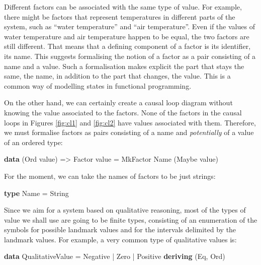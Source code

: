 \documentclass[]{article}
\newenvironment{Shaded}{}{}
\newcommand{\KeywordTok}[1]{\textcolor[rgb]{0.00,0.44,0.13}{\textbf{{#1}}}}
\newcommand{\DataTypeTok}[1]{\textcolor[rgb]{0.56,0.13,0.00}{{#1}}}
\newcommand{\OtherTok}[1]{\textcolor[rgb]{0.00,0.44,0.13}{{#1}}}
\newcommand{\FunctionTok}[1]{\textcolor[rgb]{0.02,0.16,0.49}{{#1}}}
\newcommand{\NormalTok}[1]{{#1}}
\begin{document}
Different factors can be associated with the same type of value. For
example, there might be factors that represent temperatures in different
parts of the system, such as ``water temperature'' and ``air
temperature''. Even if the values of water temperature and air
temperature happen to be equal, the two factors are still different.
That means that a defining component of a factor is its identifier, its
name. This suggests formalising the notion of a factor as a pair
consisting of a name and a value. Such a formalisation makes explicit
the part that stays the same, the name, in addition to the part that
changes, the value. This is a common way of modelling states in
functional programming.

On the other hand, we can certainly create a causal loop diagram
without knowing the value associated to the factors. None of the
factors in the causal loops in Figures \ref{fig:cl1} and \ref{fig:cl2}
have values associated with them. Therefore, we must formalise factors
as pairs consisting of a name and \emph{potentially} of a value of an
ordered type:

\begin{Shaded}
\begin{Highlighting}[]
\KeywordTok{data} \NormalTok{(}\DataTypeTok{Ord} \NormalTok{value) }\OtherTok{=>} \DataTypeTok{Factor} \NormalTok{value  }\FunctionTok{=}  \DataTypeTok{MkFactor} \DataTypeTok{Name} \NormalTok{(}\DataTypeTok{Maybe} \NormalTok{value)}
\end{Highlighting}
\end{Shaded}

For the moment, we can take the names of factors to be just strings:

\begin{Shaded}
\begin{Highlighting}[]
\KeywordTok{type} \DataTypeTok{Name}  \FunctionTok{=}  \DataTypeTok{String}
\end{Highlighting}
\end{Shaded}

Since we aim for a system based on qualitative reasoning, most of the
types of value we shall use are going to be finite types, consisting of
an enumeration of the symbols for possible landmark values and for the
intervals delimited by the landmark values. For example, a very common
type of qualitative values is:

\begin{Shaded}
\begin{Highlighting}[]
\KeywordTok{data} \DataTypeTok{QualitativeValue}        \FunctionTok{=}  \DataTypeTok{Negative} \FunctionTok{|} \DataTypeTok{Zero} \FunctionTok{|} \DataTypeTok{Positive}
                                \KeywordTok{deriving} \NormalTok{(}\DataTypeTok{Eq}\NormalTok{, }\DataTypeTok{Ord}\NormalTok{)}
\end{Highlighting}
\end{Shaded}
\end{document}
